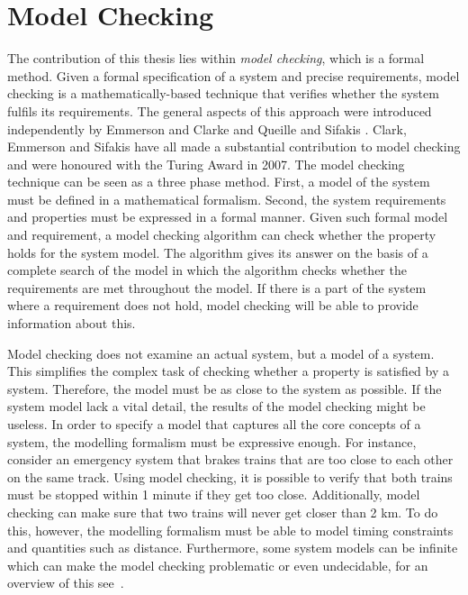 \section{Model Checking}

The contribution of this thesis lies within \emph{model checking}, which is a formal method. 
Given a formal specification of a system and precise requirements, model checking is a mathematically-based technique that verifies whether the system fulfils its requirements. 
The general aspects of this approach were introduced independently by Emmerson and Clarke \cite{EC1980,CE1982} and Queille and Sifakis \cite{QS1982}. Clark, Emmerson and Sifakis have all made a substantial contribution to model checking and were honoured with the Turing Award in 2007. 
The model checking technique can be seen as a three phase method. 
First, a model of the system must be defined in a mathematical formalism. 
Second, the system requirements and properties must be expressed in a formal manner. 
Given such formal model and requirement, a model checking algorithm can check whether the property holds for the system model. 
The algorithm gives its answer on the basis of a complete search of the model in which the algorithm checks whether the requirements are met throughout the model.
If there is a part of the system where a requirement does not hold, model checking will be able to provide information about this.

Model checking does not examine an actual system, but a model of a system. This simplifies the complex task of checking whether a property is satisfied by a system. Therefore, the model must be as close to the system as possible. 
If the system model lack a vital detail, the results of the model checking might be useless. In order to specify a model that captures all the core concepts of a system, the modelling formalism must be expressive enough. For instance, consider an emergency system that brakes trains that are too close to each other on the same track. 
Using model checking, it is possible to verify that both trains must be stopped within 1 minute if they get too close. Additionally, model checking can make sure that two trains will never get closer than 2 km. To do this, however, the modelling formalism must be able to model timing constraints and quantities such as distance. Furthermore, some system models can be infinite which can make the model checking problematic or even undecidable, for an overview of this see~\cite{DBLP:books/ws/phaunRS01/BurkartE01,Moller:1996:IR:646731.703702}.

